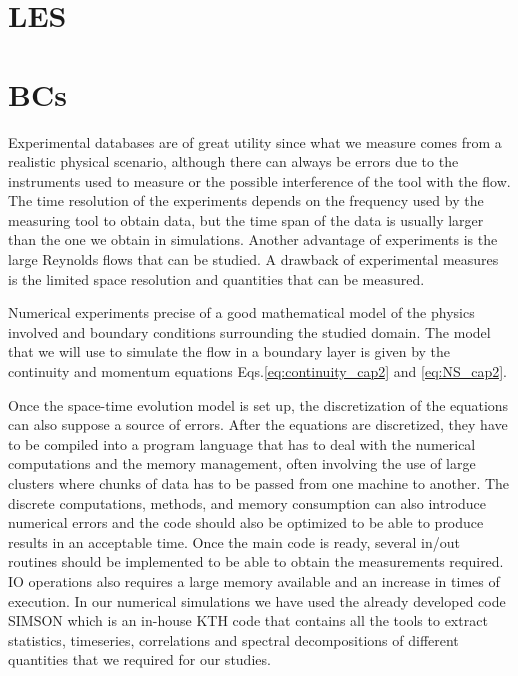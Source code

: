 





\section{LES}


\section{BCs}




Experimental databases are of great utility since what we measure comes from a realistic physical scenario, although there can always be errors due to the instruments used to measure or the possible interference of the tool with the flow.
The time resolution of the experiments depends on the frequency used by the measuring tool to obtain data, but the time span of the data is usually larger than the one we obtain in simulations.
Another advantage of experiments is the large Reynolds flows that can be studied.
A drawback of experimental measures is the limited space resolution and quantities that can be measured.

Numerical experiments precise of a good mathematical model of the physics involved and boundary conditions surrounding the studied domain. The model that we will use to simulate the flow in a boundary layer is given by the continuity and momentum equations Eqs.\ref{eq:continuity_cap2} and \ref{eq:NS_cap2}.

Once the space-time evolution model is set up, the discretization of the equations can also suppose a source of errors. After the equations are discretized, they have to be compiled into a program language that has to deal with the numerical computations and the memory management, often involving the use of large clusters where chunks of data has to be passed from one machine to another. The discrete computations, methods, and memory consumption can also introduce numerical errors and the code should also be optimized to be able to produce results in an acceptable time.
Once the main code is ready, several in/out routines should be implemented to be able to obtain the measurements required. IO operations also requires a large memory available and an increase in times of execution.
In our numerical simulations we have used the already developed code SIMSON which is an in-house KTH code that contains all the tools to extract statistics, timeseries, correlations and spectral decompositions of different quantities that we required for our studies.

